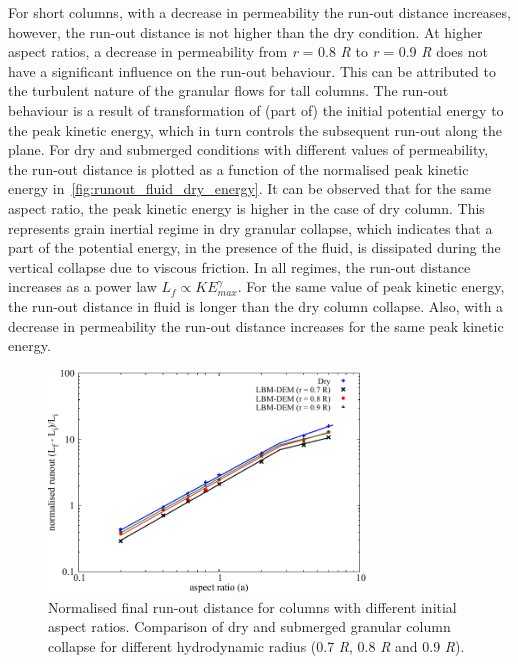 For short columns, with a decrease in permeability the run-out distance 
increases, however, the run-out distance is not higher than the dry condition. 
At higher aspect ratios, a decrease in permeability from \textit{r} = 0.8 
\textit{R} to 
\textit{r} = 0.9 \textit{R} 
does not have a significant influence on the run-out behaviour. This can be 
attributed to the turbulent nature of the granular flows for tall 
columns. The run-out behaviour is a result of transformation of (part of) the 
initial potential energy to the peak kinetic energy, which in turn controls the 
subsequent run-out along the plane. For dry and submerged conditions with 
different values of permeability, the run-out distance is plotted as a 
function of the normalised peak kinetic energy 
in~\cref{fig:runout_fluid_dry_energy}. It can be observed that for the same 
aspect ratio, the peak kinetic energy is higher in the case of dry column. This 
represents grain inertial regime in dry granular collapse, which indicates that 
a part of the potential energy, in the presence of the fluid, is dissipated 
during the vertical collapse due to viscous friction. In all regimes, the 
run-out distance increases as a power law $L_f \propto KE_{max}^\gamma$. For 
the same value of peak kinetic energy, the run-out distance in fluid is longer 
than the dry column collapse. Also, with a decrease in 
permeability the run-out distance increases for the same peak kinetic energy. 
\begin{figure}[htbp]
	\centering
	\includegraphics[width=0.75\textwidth]{runout_fluid_dry}
	\caption{Normalised final run-out distance for columns with different 
	initial aspect ratios. Comparison of dry and submerged granular column 
	collapse for different hydrodynamic radius (0.7 \textit{R}, 0.8 \textit{R} 
	and 0.9 \textit{R}).}
	\label{fig:runout_fluid_dry}
\end{figure} 


